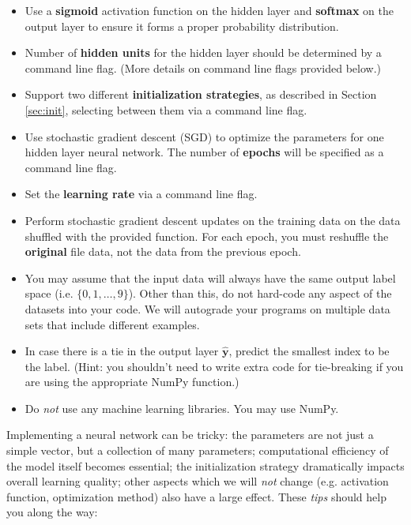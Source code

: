 \documentclass[11pt,addpoints,answers]{exam}
\newcommand{\yv}{\mathbf{y}}
\begin{document}
\begin{itemize}
    \item Use a {\bf sigmoid} activation function on the hidden layer and {\bf softmax} on the  output layer to ensure it forms a proper probability distribution.
    \item Number of {\bf hidden units} for the hidden layer should be determined by a command line flag. (More details on command line flags provided below.)
    \item Support two different {\bf initialization strategies}, as described in Section \ref{sec:init}, selecting between them via a command line flag.
    \item Use stochastic gradient descent (SGD) to optimize the parameters for one hidden layer neural network. The number of {\bf epochs} will be specified as a command line flag. 
    \item Set the {\bf learning rate} via a command line flag.
    \item Perform stochastic gradient descent updates on the training data on the data shuffled with the provided function. For each epoch, you must reshuffle the \textbf{original} file data, not the data from the previous epoch.
    \item You may assume that the input data will always have the same output label space (i.e. $\{0,1,\ldots,9\}$). Other than this, do not hard-code any aspect of the datasets into your code. We will autograde your programs on multiple data sets that include different examples.
    \item In case there is a tie in the output layer $\hat{\yv}$, predict the smallest index to be the label. (Hint: you shouldn't need to write extra code for tie-breaking if you are using the appropriate NumPy function.)
    \item Do \emph{not} use any machine learning libraries. You may use NumPy.
\end{itemize}

Implementing a neural network can be tricky: the parameters are not just a simple vector, but a collection of many parameters; computational efficiency of the model itself becomes essential; the initialization strategy dramatically impacts overall learning quality;  other aspects which we will \emph{not} change (e.g. activation function, optimization method) also have a large effect. These \emph{tips} should help you along the way:
\end{document}
